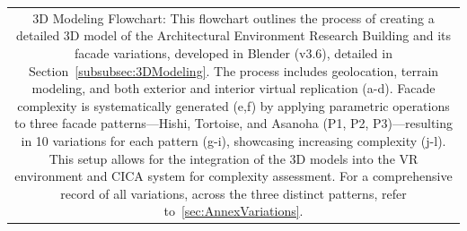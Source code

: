 \begin{linenumbers}
\begin{table}[!htb]
\begin{tabular}{c}
\begin{minipage}{\textwidth}
{3D Modeling Flowchart: This flowchart outlines the process of creating a detailed 3D model of the Architectural Environment Research Building and its facade variations, developed in Blender (v3.6), detailed in Section~\ref{subsubsec:3DModeling}. The process includes geolocation, terrain modeling, and both exterior and interior virtual replication (a-d). Facade complexity is systematically generated (e,f) by applying parametric operations to three facade patterns—Hishi, Tortoise, and Asanoha (P1, P2, P3)—resulting in 10 variations for each pattern (g-i), showcasing increasing complexity (j-l).  This setup allows for the integration of the 3D models into the VR environment and CICA system for complexity assessment. For a comprehensive record of all variations, across the three distinct patterns, refer to~\ref{sec:AnnexVariations}.
}
\label{fig:modeling_flowchart}
\end{minipage}
\end{tabular}
\end{table}


\end{linenumbers}
